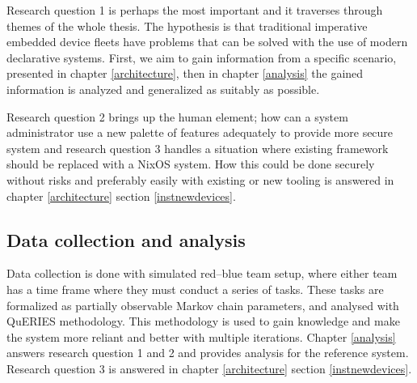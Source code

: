 Research question 1 is perhaps the most important and it traverses
through themes of the whole thesis. The hypothesis is that traditional
imperative embedded device fleets have problems that can be solved
with the use of modern declarative systems. First, we aim to gain
information from a specific scenario, presented in chapter
\ref{architecture}, then in chapter \ref{analysis} the gained
information is analyzed and generalized as suitably as possible.

Research question 2 brings up the human element; how can a system
administrator use a new palette of features adequately to provide more
secure system and research question 3 handles a situation where
existing framework should be replaced with a NixOS system. How this
could be done securely without risks and preferably easily with
existing or new tooling is answered in chapter \ref{architecture}
section \ref{instnewdevices}.

\subsection{Data collection and analysis}

Data collection is done with simulated red–blue team setup, where
either team has a time frame where they must conduct a series of
tasks. These tasks are formalized as partially observable Markov chain
parameters, and analysed with QuERIES methodology. This methodology is
used to gain knowledge and make the system more reliant and better
with multiple iterations. Chapter \ref{analysis} answers research
question 1 and 2 and provides analysis for the reference
system. Research question 3 is answered in chapter \ref{architecture}
section \ref{instnewdevices}.
